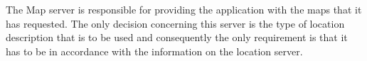  
The Map server is responsible for providing the application with the maps that it has requested. The only decision concerning this server is the type of location description that is to be used and consequently the only requirement is that it has to be in accordance with the information on the location server. 
 
 
 